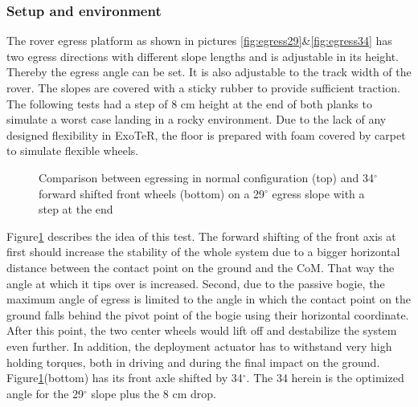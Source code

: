 \documentclass[a4paper,twocolumn]{esapub2005} %
\begin{document}
\subsubsection{Setup and environment}
The rover egress platform as shown in pictures \ref{fig:egress29}\&\ref{fig:egress34} has two egress directions with different slope lengths and is adjustable in its height. Thereby the egress angle can be set. It is also adjustable to the track width of the rover. The slopes are covered with a sticky rubber to provide sufficient traction. The following tests had a step of 8 cm height at the end of both planks to simulate a worst case landing in a rocky environment. 
Due to the lack of any designed flexibility in ExoTeR, the floor is prepared with foam covered by carpet to simulate flexible wheels.
\begin{figure}[h]
	\centering
	\caption{Comparison between egressing in normal configuration (top) and 34$^{\circ}$ forward shifted front wheels (bottom) on a 29$^{\circ}$ egress slope with a step at the end}
	\label{fig:egress29com}
\end{figure}
Figure\ref{fig:egress29com} describes the idea of this test. The forward shifting of the front axis at first should increase the stability of the whole system due to a bigger horizontal distance between the contact point on the ground and the CoM. That way the angle at which it tips over is increased. Second, due to the passive bogie, the maximum angle of egress is limited to the angle in which the contact point on the ground falls behind the pivot point of the bogie using their horizontal coordinate. After this point, the two center wheels would lift off and destabilize the system even further. In addition, the deployment actuator has to withstand very high holding torques, both in driving and during the final impact on the ground.
Figure\ref{fig:egress29com}(bottom) has its front axle shifted by 34$^\circ$. The 34 herein is the optimized angle for the 29$^\circ$ slope plus the 8 cm drop. 
\end{document}
